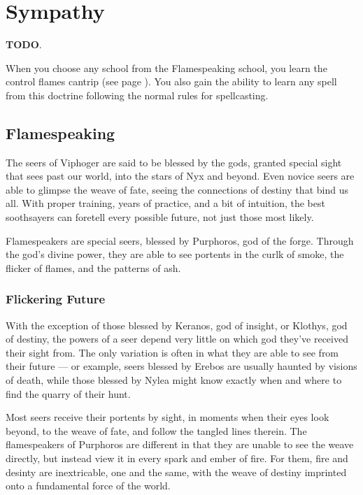 \section{Sympathy} \label{sec::sympathy}
\textbf{TODO}.

When you choose any school from the Flamespeaking school, you learn the control flames cantrip (see page \pageref{spell::controlflames}).
You also gain the ability to learn any spell from this doctrine following the normal rules for spellcasting.

\subsection*{Flamespeaking} \label{ssec::flamespeaking}

    The seers of Viphoger are said to be blessed by the gods, granted special sight that sees past our world, into the stars of Nyx and beyond.
    Even novice seers are able to glimpse the weave of fate, seeing the connections of destiny that bind us all.
    With proper training, years of practice, and a bit of intuition, the best soothsayers can foretell every possible future, not just those most likely.

    Flamespeakers are special seers, blessed by Purphoros, god of the forge.
    Through the god's divine power, they are able to see portents in the curlk of smoke, the flicker of flames, and the patterns of ash.

    \subsubsection{Flickering Future}
        With the exception of those blessed by Keranos, god of insight, or Klothys, god of destiny, the powers of a seer depend very little on which god they've received their sight from.
        The only variation is often in what they are able to see from their future --- or example, seers blessed by Erebos are usually haunted by visions of death, while those blessed by Nylea might know exactly when and where to find the quarry of their hunt.

        Most seers receive their portents by sight, in moments when their eyes look beyond, to the weave of fate, and follow the tangled lines therein.
        The flamespeakers of Purphoros are different in that they are unable to see the weave directly, but instead view it in every spark and ember of fire.
        For them, fire and desinty are inextricable, one and the same, with the weave of destiny imprinted onto a fundamental force of the world.

